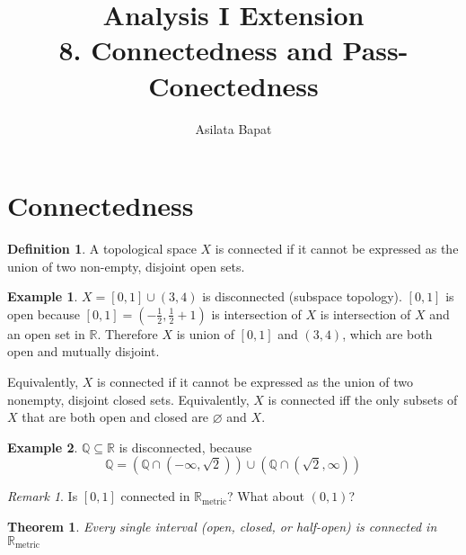 \documentclass[12pt]{amsart}
\title[Connectedness]
	{Analysis I Extension\\8. Connectedness and Pass-Conectedness}
\author{Asilata Bapat}
\newcommand{\bbR}{\mathbb{R}}
\newcommand{\bbQ}{\mathbb{Q}}
\theoremstyle{plain}
\newtheorem*{thm}{Theorem}
\theoremstyle{remark}
\newtheorem*{rmk}{Remark}
\theoremstyle{definition}
\newtheorem*{define}{Definition}
\newtheorem*{eg}{Example}
\begin{document}
\maketitle
{}

\section*{Connectedness}
\begin{define}
	A topological space $X$ is connected if it cannot be expressed as the union of two non-empty, disjoint open sets.
\end{define}
\begin{eg}
	$X = [0, 1] \cup (3,4)$ is disconnected (subspace topology).
	\newline
	$[0,1]$ is open because $[0, 1] = (-\frac{1}{2}, \frac{1}{2} + 1)$ is intersection of $X$ is intersection of $X$ and an open set in $\bbR$. Therefore $X$ is union of $[0,1]$ and $(3,4)$, which are both open and mutually disjoint.
\end{eg}

Equivalently, $X$ is connected if it cannot be expressed as the union of two nonempty, disjoint closed sets. Equivalently, $X$ is connected iff the only subsets of $X$ that are both open and closed are $\varnothing$ and $X$.

\begin{eg}
	$\bbQ \subseteq \bbR$ is disconnected, because 
	\begin{equation*}
		\bbQ = (\bbQ \cap (-\infty, \sqrt{2})) \cup (\bbQ \cap (\sqrt{2}, \infty))
	\end{equation*}
\end{eg}

\begin{rmk}
	Is $[0, 1]$ connected in $\bbR_{\text{metric}}$? What about $(0, 1)$?
\end{rmk}

\begin{thm}
	Every single interval (open, closed, or half-open) is connected in $\bbR_{\text{metric}}$
\end{thm}
\end{document}
